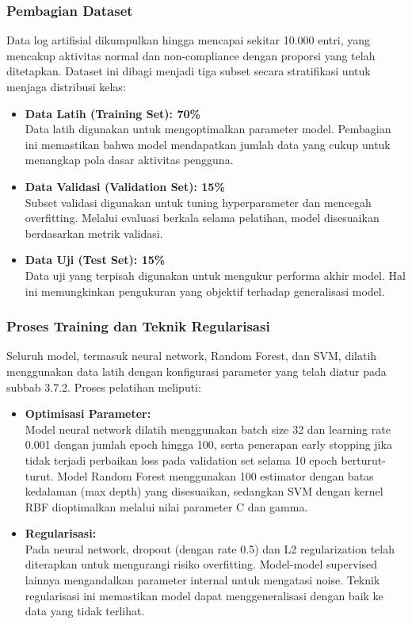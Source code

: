 \subsubsection{Pembagian Dataset}
Data log artifisial dikumpulkan hingga mencapai sekitar 10.000 entri, yang mencakup aktivitas normal dan non-compliance dengan proporsi yang telah ditetapkan. Dataset ini dibagi menjadi tiga subset secara stratifikasi untuk menjaga distribusi kelas:
\begin{itemize}
    \item \textbf{Data Latih (Training Set): 70\%}\\
    Data latih digunakan untuk mengoptimalkan parameter model. Pembagian ini memastikan bahwa model mendapatkan jumlah data yang cukup untuk menangkap pola dasar aktivitas pengguna.
    
    \item \textbf{Data Validasi (Validation Set): 15\%}\\
    Subset validasi digunakan untuk tuning hyperparameter dan mencegah overfitting. Melalui evaluasi berkala selama pelatihan, model disesuaikan berdasarkan metrik validasi.
    
    \item \textbf{Data Uji (Test Set): 15\%}\\
    Data uji yang terpisah digunakan untuk mengukur performa akhir model. Hal ini memungkinkan pengukuran yang objektif terhadap generalisasi model.
\end{itemize}

\subsubsection{Proses Training dan Teknik Regularisasi}
Seluruh model, termasuk neural network, Random Forest, dan SVM, dilatih menggunakan data latih dengan konfigurasi parameter yang telah diatur pada subbab 3.7.2. Proses pelatihan meliputi:
\begin{itemize}
    \item \textbf{Optimisasi Parameter:}\\
    Model neural network dilatih menggunakan batch size 32 dan learning rate 0.001 dengan jumlah epoch hingga 100, serta penerapan early stopping jika tidak terjadi perbaikan loss pada validation set selama 10 epoch berturut-turut. Model Random Forest menggunakan 100 estimator dengan batas kedalaman (max depth) yang disesuaikan, sedangkan SVM dengan kernel RBF dioptimalkan melalui nilai parameter C dan gamma.
    
    \item \textbf{Regularisasi:}\\
    Pada neural network, dropout (dengan rate 0.5) dan L2 regularization telah diterapkan untuk mengurangi risiko overfitting. Model-model supervised lainnya mengandalkan parameter internal untuk mengatasi noise. Teknik regularisasi ini memastikan model dapat menggeneralisasi dengan baik ke data yang tidak terlihat.
\end{itemize}

